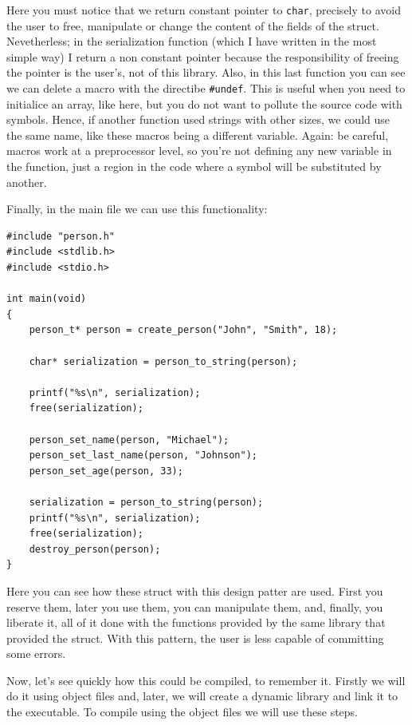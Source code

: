\documentclass[a4paper]{article}
\begin{document}
Here you must notice that we return constant pointer to \verb!char!, precisely
to avoid the user to free, manipulate or change the content of the fields of
the struct. Nevetherless; in the serialization function (which I have written in
the most simple way) I return a non constant pointer because the responsibility
of freeing the pointer is the user's, not of this library. Also, in this last
function you can see we can delete a macro with the directibe \verb!#undef!.
This is useful when you need to initialice an array, like here, but you do not
want to pollute the source code with symbols. Hence, if another function used
strings with other sizes, we could use the same name, like these macros being
a different variable. Again: be careful, macros work at a preprocessor level,
so you're not defining any new variable in the function, just a region in the
code where a symbol will be substituted by another.

Finally, in the main file we can use this functionality:

\noindent
\begin{minipage}[H]{\linewidth}
\mbox{}
\begin{lstlisting}[style=C, label={lst:finalExMain},
caption={Final example of program  -- \texttt{main.c}}]
#include "person.h"
#include <stdlib.h>
#include <stdio.h>

int main(void)
{
    person_t* person = create_person("John", "Smith", 18);

    char* serialization = person_to_string(person);

    printf("%s\n", serialization);
    free(serialization);

    person_set_name(person, "Michael");
    person_set_last_name(person, "Johnson");
    person_set_age(person, 33);

    serialization = person_to_string(person);
    printf("%s\n", serialization);
    free(serialization);
    destroy_person(person);
}
\end{lstlisting}
\end{minipage}

Here you can see how these struct with this design patter are used. First you
reserve them, later you use them, you can manipulate them, and, finally, you
liberate it, all of it done with the functions provided by the same library
that provided the struct. With this pattern, the user is less capable of
committing some errors.

Now, let's see quickly how this could be compiled, to remember it. Firstly we
will do it using object files and, later, we will create a dynamic library and
link it to the executable. To compile using the object files we will use these
steps.
\end{document}

